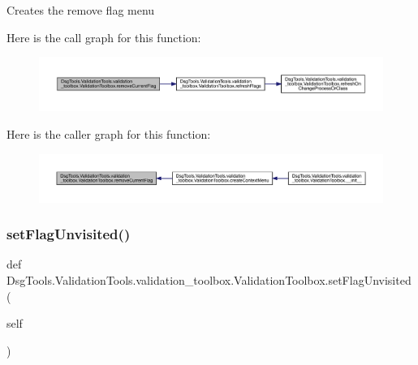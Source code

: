 \begin{DoxyVerb}Creates the remove flag menu
\end{DoxyVerb}
 Here is the call graph for this function\+:
\nopagebreak
\begin{figure}[H]
\begin{center}
\leavevmode
\includegraphics[width=350pt]{class_dsg_tools_1_1_validation_tools_1_1validation__toolbox_1_1_validation_toolbox_acaabb546a967dba84db62cab485eec4d_cgraph}
\end{center}
\end{figure}
Here is the caller graph for this function\+:
\nopagebreak
\begin{figure}[H]
\begin{center}
\leavevmode
\includegraphics[width=350pt]{class_dsg_tools_1_1_validation_tools_1_1validation__toolbox_1_1_validation_toolbox_acaabb546a967dba84db62cab485eec4d_icgraph}
\end{center}
\end{figure}
\mbox{\label{class_dsg_tools_1_1_validation_tools_1_1validation__toolbox_1_1_validation_toolbox_a9cf6616d80de7833b2961f81a68b146a}} 
\subsubsection{\texorpdfstring{set\+Flag\+Unvisited()}{setFlagUnvisited()}}
{\footnotesize\ttfamily def Dsg\+Tools.\+Validation\+Tools.\+validation\+\_\+toolbox.\+Validation\+Toolbox.\+set\+Flag\+Unvisited (\begin{DoxyParamCaption}\item[{}]{self }\end{DoxyParamCaption})}

